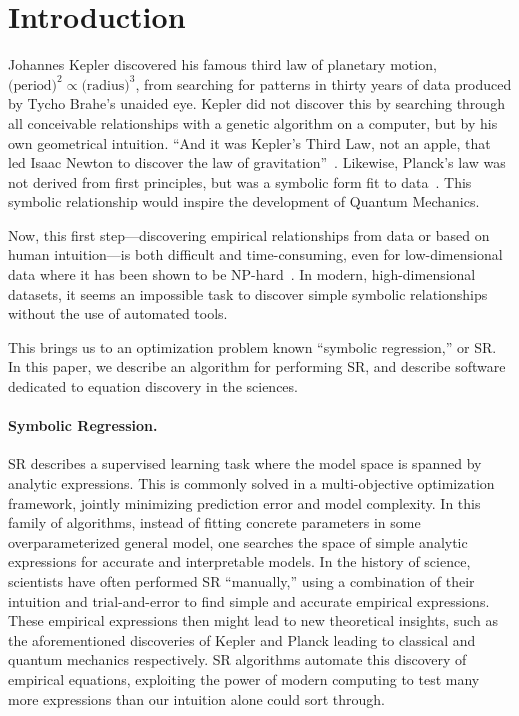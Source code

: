 \documentclass[letterpaper,twocolumn]{scrartcl}
\begin{document}
\section{Introduction}
\label{sec:intro_pysr}







Johannes Kepler discovered his famous third law of planetary motion, $\text{(period)}^2 \propto \text{(radius)}^3$, from searching for patterns in thirty years of data produced by Tycho Brahe's unaided eye.
Kepler did not discover this by searching through all conceivable relationships with a genetic algorithm on a computer, but by his own geometrical intuition. 
``And it was Kepler's Third Law, not an apple, that led Isaac Newton to discover the law of gravitation''~\cite{hawkingShouldersGiantsGreat2004}.
Likewise, Planck's law was not derived from first principles, but was a symbolic form fit to data~\cite{planckUeberVerbesserungWien1900}.
This symbolic relationship would inspire the development of Quantum Mechanics.

Now, this first step---discovering empirical relationships from data or based on human intuition---is both difficult and time-consuming, even for low-dimensional data where it has been shown to be NP-hard~\cite{virgolinSymbolicRegressionNPhard2022}.
In modern, high-dimensional datasets, it seems an impossible task to discover simple symbolic relationships without the use of automated tools.

This brings us to an optimization problem known ``symbolic regression,'' or SR.
In this paper, we describe an algorithm for performing SR, and describe software dedicated to equation discovery in the sciences.

\paragraph{Symbolic Regression.}
SR describes a supervised learning task where the model space is spanned by analytic expressions.
This is commonly solved in a multi-objective optimization framework, jointly minimizing prediction error and model complexity.
In this family of algorithms, instead of fitting concrete parameters in some overparameterized general model, one searches the space of simple analytic expressions for accurate and interpretable models.
In the history of science, scientists have often performed SR ``manually,'' using a combination of their intuition and trial-and-error to find simple and accurate empirical expressions.
These empirical expressions then might lead to new theoretical insights, such as the aforementioned discoveries of Kepler and Planck leading to classical and quantum mechanics respectively.
SR algorithms automate this discovery of empirical equations, exploiting the power of modern computing to test many more expressions than our intuition alone could sort through.
\end{document}
